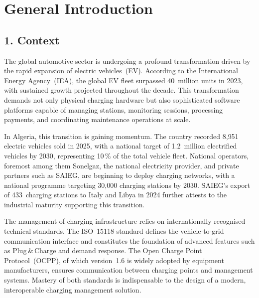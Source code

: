 \documentclass[12pt,a4paper]{report}
\begin{document}
\clearpage
\hypersetup{pageanchor=true}


\chapter*{General Introduction}

\section*{1. Context}

The global automotive sector is undergoing a profound transformation driven by the rapid
expansion of electric vehicles~(EV). According to the International Energy Agency~(IEA),
the global EV fleet surpassed 40~million units in 2023, with sustained growth projected
throughout the decade. This transformation demands not only
physical charging hardware but also sophisticated software platforms capable of managing
stations, monitoring sessions, processing payments, and coordinating maintenance operations
at scale.

In Algeria, this transition is gaining momentum. The country recorded 8{,}951 electric
vehicles sold in 2025, with a national target of 1.2~million electrified
vehicles by 2030, representing 10\,\% of the total vehicle fleet.
National operators, foremost among them Sonelgaz, the national electricity provider, and
private partners such as SAIEG, are beginning to deploy charging networks, with a national
programme targeting 30{,}000 charging stations by 2030. SAIEG's export of 433~charging
stations to Italy and Libya in 2024 further attests to the industrial maturity supporting
this transition.

The management of charging infrastructure relies on internationally recognised technical
standards. The ISO~15118 standard defines the vehicle-to-grid communication interface and constitutes
the foundation of advanced features such as Plug\,\&\,Charge and demand response. The Open
Charge Point Protocol~(OCPP), of which version~1.6 is widely adopted by equipment
manufacturers, ensures
communication between charging points and management systems. Mastery of both standards is
indispensable to the design of a modern, interoperable charging management solution.
\end{document}
